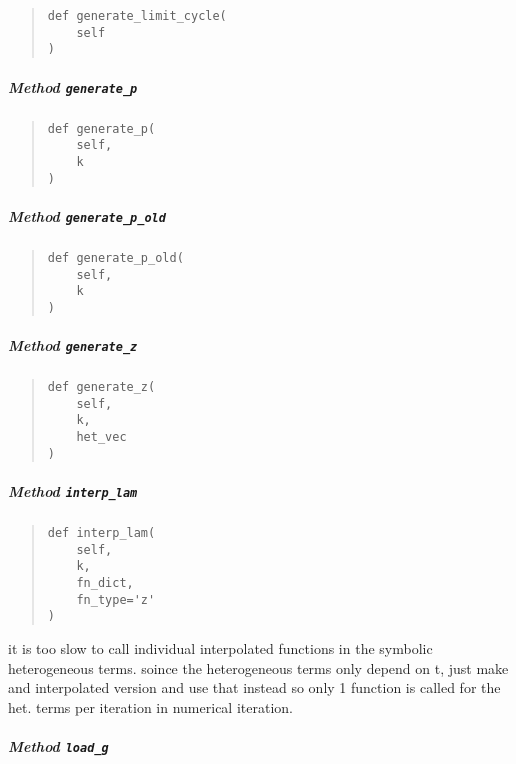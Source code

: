 \documentclass[english,a4paper,oneside]{article}
\let\oldsubparagraph\subparagraph
\renewcommand{\subparagraph}[1]{\oldsubparagraph{#1}\mbox{}}
\begin{document}
\begin{quote}
\begin{verbatim}
def generate_limit_cycle(
    self
)
\end{verbatim}
\end{quote}

\subparagraph{\texorpdfstring{Method
\texttt{generate\_p}}{Method generate\_p}}\label{StrongCoupling.StrongCoupling.generate_p}

\begin{quote}
\begin{verbatim}
def generate_p(
    self,
    k
)
\end{verbatim}
\end{quote}

\subparagraph{\texorpdfstring{Method
\texttt{generate\_p\_old}}{Method generate\_p\_old}}\label{StrongCoupling.StrongCoupling.generate_p_old}

\begin{quote}
\begin{verbatim}
def generate_p_old(
    self,
    k
)
\end{verbatim}
\end{quote}

\subparagraph{\texorpdfstring{Method
\texttt{generate\_z}}{Method generate\_z}}\label{StrongCoupling.StrongCoupling.generate_z}

\begin{quote}
\begin{verbatim}
def generate_z(
    self,
    k,
    het_vec
)
\end{verbatim}
\end{quote}

\subparagraph{\texorpdfstring{Method
\texttt{interp\_lam}}{Method interp\_lam}}\label{StrongCoupling.StrongCoupling.interp_lam}

\begin{quote}
\begin{verbatim}
def interp_lam(
    self,
    k,
    fn_dict,
    fn_type='z'
)
\end{verbatim}
\end{quote}

it is too slow to call individual interpolated functions in the symbolic
heterogeneous terms. soince the heterogeneous terms only depend on t,
just make and interpolated version and use that instead so only 1
function is called for the het. terms per iteration in numerical
iteration.

\subparagraph{\texorpdfstring{Method
\texttt{load\_g}}{Method load\_g}}\label{StrongCoupling.StrongCoupling.load_g}
\end{document}
